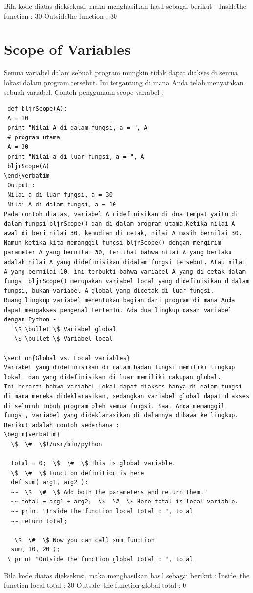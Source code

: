 Bila kode diatas dieksekusi, maka menghasilkan hasil sebagai berikut -
  Inside\~the function :  30 
 Outside\~the function :  30 
\section{Scope of Variables} 
Semua variabel dalam sebuah program mungkin tidak dapat diakses di semua lokasi dalam program tersebut. Ini tergantung di mana Anda telah menyatakan sebuah variabel. 
Contoh penggunaan scope variabel : 
\begin{verbatim}
 def bljrScope(A):
 A = 10
 print "Nilai A di dalam fungsi, a = ", A
 # program utama
 A = 30
 print "Nilai a di luar fungsi, a = ", A
 bljrScope(A)
\end{verbatim
 Output :
 Nilai a di luar fungsi, a = 30
 Nilai A di dalam fungsi, a = 10
Pada contoh diatas, variabel A didefinisikan di dua tempat yaitu di dalam fungsi bljrScope() dan di dalam program utama.Ketika nilai A awal di beri nilai 30, kemudian di cetak, nilai A masih bernilai 30. Namun ketika kita memanggil fungsi bljrScope() dengan mengirim parameter A yang bernilai 30, terlihat bahwa nilai A yang berlaku adalah nilai A yang didefinisikan didalam fungsi tersebut. Atau nilai A yang bernilai 10. ini terbukti bahwa variabel A yang di cetak dalam fungsi bljrScope() merupakan variabel local yang didefinisikan didalam fungsi, bukan variabel A global yang dicetak di luar fungsi.  
Ruang lingkup variabel menentukan bagian dari program di mana Anda dapat mengakses pengenal tertentu. Ada dua lingkup dasar variabel dengan Python - 
   \$ \bullet \$ Variabel global 
   \$ \bullet \$ Variabel local 

\section{Global vs. Local variables} 
Variabel yang didefinisikan di dalam badan fungsi memiliki lingkup lokal, dan yang didefinisikan di luar memiliki cakupan global. 
Ini berarti bahwa variabel lokal dapat diakses hanya di dalam fungsi di mana mereka dideklarasikan, sedangkan variabel global dapat diakses di seluruh tubuh program oleh semua fungsi. Saat Anda memanggil fungsi, variabel yang dideklarasikan di dalamnya dibawa ke lingkup. Berikut adalah contoh sederhana :
\begin{verbatim}
  \$  \#  \$!/usr/bin/python 

  total = 0;  \$  \#  \$ This is global variable. 
  \$  \#  \$ Function definition is here 
  def sum( arg1, arg2 ): 
  ~~  \$  \#  \$ Add both the parameters and return them." 
  ~~ total = arg1 + arg2;  \$  \#  \$ Here total is local variable. 
  ~~ print "Inside the function local total : ", total 
  ~~ return total; 

   \$  \#  \$ Now you can call sum function 
  sum( 10, 20 ); 
 \ print "Outside the function global total : ", total  
 \end{verbatim}
Bila kode diatas dieksekusi, maka menghasilkan hasil sebagai berikut : 
  Inside~the function local total :  30 
 Outside~the function global total :  0 


